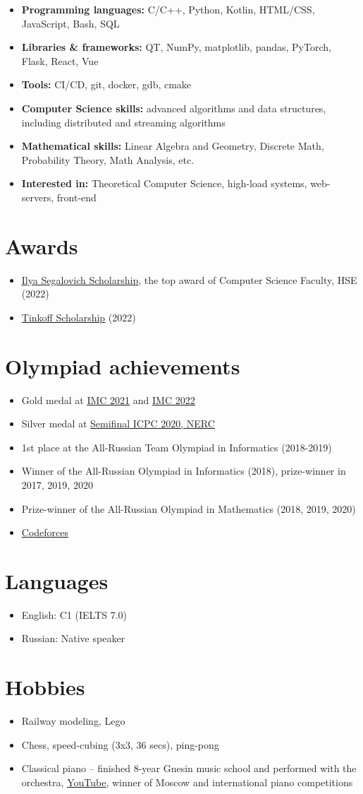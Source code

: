 \documentclass[letterpaper,11pt]{article}
\newcommand{\resumeItemListStart}{\begin{itemize}}
\newcommand{\resumeItemListEnd}{\end{itemize}\vspace{-8pt}}
\newcommand{\resumeItem}[1]{\item\small{{#1 \vspace{-2pt}}}}
\newcommand{\resumeSubItem}[1]{\resumeItem{#1}\vspace{-4pt}}
\begin{document}
\resumeItemListStart
\resumeSubItem{\textbf{Programming languages: }{C/C++, Python, Kotlin, HTML/CSS, JavaScript, Bash, SQL}}
\resumeSubItem{\textbf{Libraries \& frameworks: }{QT, NumPy, matplotlib, pandas, PyTorch, Flask, React, Vue}}
\resumeSubItem{\textbf{Tools: }{CI/CD, git, docker, gdb, cmake}}
\resumeSubItem{\textbf{Computer Science skills: }{advanced algorithms and data structures, including distributed and streaming algorithms}}
\resumeSubItem{\textbf{Mathematical skills: }{Linear Algebra and Geometry, Discrete Math, Probability Theory, Math Analysis, etc.}}
\resumeSubItem{\textbf{Interested in: }{Theoretical Computer Science, high-load systems, web-servers, front-end}}
\resumeItemListEnd


\section{Awards}

\resumeItemListStart
\resumeSubItem{\href{https://cs.hse.ru/en/stipend}{\underline{Ilya Segalovich Scholarship}}, the top award of Computer Science Faculty, HSE (2022)}
\resumeSubItem{\href{https://www.tinkoff.ru/about/news/06042022-tinkoff-launches-scholarship-programme-for-russias-young-talent-eng/}{\underline{Tinkoff Scholarship}} (2022)}
\resumeItemListEnd


\section{Olympiad achievements}

\resumeItemListStart
\resumeSubItem{Gold medal at \href{https://imc-math.org.uk/?year=2021}{\underline{IMC 2021}} and \href{https://imc-math.org.uk/?year=2022}{\underline{IMC 2022}}}
\resumeSubItem{Silver medal at \href{https://neerc.ifmo.ru/archive/2020.html}{\underline{Semifinal ICPC 2020, NERC}}}
\resumeSubItem{1st place at the All-Russian Team Olympiad in Informatics (2018-2019)}
\resumeSubItem{Winner of the All-Russian Olympiad in Informatics (2018), prize-winner in 2017, 2019, 2020}
\resumeSubItem{Prize-winner of the All-Russian Olympiad in Mathematics (2018, 2019, 2020)}
\resumeSubItem{\href{https://codeforces.com/profile/Kuyan}{\underline{Codeforces}}}
\resumeItemListEnd


\section{Languages}

\resumeItemListStart
\resumeSubItem{English: C1 (IELTS 7.0)}
\resumeSubItem{Russian: Native speaker}
\resumeItemListEnd


\section{Hobbies}

\resumeItemListStart
\resumeSubItem{Railway modeling, Lego}
\resumeSubItem{Chess, speed-cubing (3x3, 36 secs), ping-pong}
\resumeSubItem{Classical piano -- finished 8-year Gnesin music school and performed with the orchestra, \href{https://www.youtube.com/user/FeodorKuyanov/playlists}{\underline{YouTube}}, winner of Moscow and international piano competitions}
\resumeItemListEnd
\end{document}
